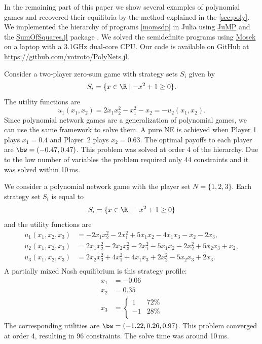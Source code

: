 In the remaining part of this paper we show several examples of polynomial games and recovered their equilibria by the method explained in the \cref{sec:poly}. We implemented the hierarchy of programs \eqref{momsdp} in Julia using \href{https://jump.dev/}{JuMP} \cite{JuMP} and the \href{https://jump.dev/SumOfSquares.jl/stable/}{SumOfSquares.jl} package \cite{PolyJuMP}. We solved the semidefinite programs using \href{https://www.mosek.com/}{Mosek} on a laptop with a 3.1GHz dual-core CPU. Our code is available on GitHub at \href{https://github.com/votroto/PolyNets.jl}{https://github.com/votroto/PolyNets.jl}.

\begin{example}
    Consider a two-player zero-sum game with strategy sets $S_i$ given by
    \[
        S_{i} = \{ x \in \R \mid  -x^2 + 1 \ge 0 \}.
    \] 
    The utility functions are
    \[
        u_{1}(x_{1},x_{2}) = 2x_{1}x_{2}^2 - x_{1}^2 - x_{2} = -u_{2}(x_{1},x_{2}).
    \]
    Since polynomial network games are a generalization of polynomial games, we can use the same framework to solve them. A pure NE is achieved when Player 1 plays $x_{1} = 0.4$ and Player~2 plays $x_{2} = 0.63$. The optimal payoffs to each player are $\bw = (-0.47, 0.47)$. This problem was solved at order 4 of the hierarchy. Due to the low number of variables the problem required only 44 constraints and it was solved within 10\,ms.
\end{example}

\begin{example}
    We consider a polynomial network game with the player set $N = \{1, 2, 3\}$. Each strategy set $S_i$ is equal to
    \[
        S_{i}   = \{ x \in \R \mid  -x^2 + 1 \ge 0 \}
    \]
    and the utility functions are
    \begin{equation*}\begin{aligned}
        u_{1}(x_{1},x_{2},x_{3}) &= -2x_{1}x_{2}^2 - 2x_{1}^2 + 5x_{1}x_{2} - 4x_{1}x_{3} - x_{2} - 2x_{3},\\
        u_{2}(x_{1},x_{2},x_{3}) &= 2x_{1}x_{2}^2 - 2x_{2}x_{3}^2 - 2x_{1}^2 - 5x_{1}x_{2} - 2x_{2}^2 + 5x_{2}x_{3} + x_{2},\\
        u_{3}(x_{1},x_{2},x_{3}) &= 2x_{2}x_{3}^2 + 4x_{1}^2 + 4x_{1}x_{3} + 2x_{2}^2 - 5x_{2}x_{3} + 2x_{3}.\\
    \end{aligned}\end{equation*}
    A partially mixed Nash equilibrium is this strategy profile:
        \[\begin{aligned}
        x_1 &= -0.06\\
        x_2 &= 0.35\\
        x_3 &=\begin{cases}
            1 &72\%\\
            -1 &28\%\\
        \end{cases}
    \end{aligned}\]
    The corresponding utilities are $\bw = (-1.22, 0.26, 0.97)$. This problem converged at order 4, resulting in 96 constraints. The solve time was around 10\,ms.
\end{example}


